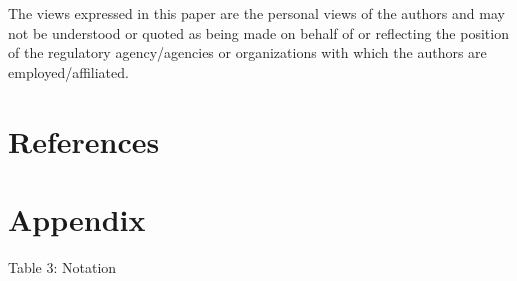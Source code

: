 \documentclass[
]{jss}
\begin{document}
The views expressed in this paper are the personal views of the authors
and may not be understood or quoted as being made on behalf of or
reflecting the position of the regulatory agency/agencies or
organizations with which the authors are employed/affiliated.

\hypertarget{references}{%
\section{References}\label{references}}

\hypertarget{appendix}{%
\section{Appendix}\label{appendix}}

Table 3: Notation
\end{document}
